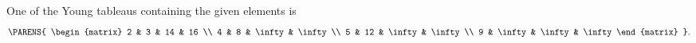 One of the Young tableaus containing the given elements is
\[
    \PARENS{
        \begin{matrix}
            2 & 3 & 14 & 16 \\
            4 & 8 & \infty & \infty \\
            5 & 12 & \infty & \infty \\
            9 & \infty & \infty & \infty
        \end{matrix}
    }.
\]
